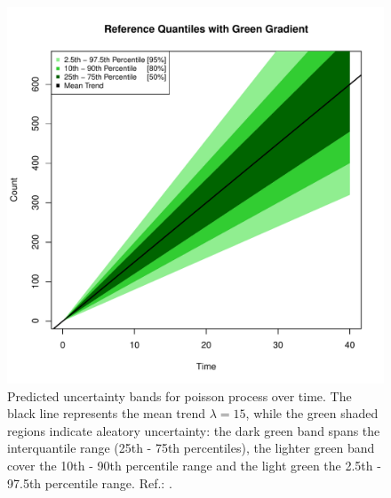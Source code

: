\begin{figure}
\begin{knitrout}
\color{fgcolor}

{\centering \includegraphics[width=\textwidth-3cm]{figure/ch02_figunnamed-chunk-4-1} 

}


\end{knitrout}
  \caption{Predicted uncertainty bands for poisson process over time. The black line represents the mean trend $\lambda = 15$, while the green shaded regions indicate aleatory uncertainty: the dark green band spans the interquantile range (25th - 75th percentiles), the lighter green band cover the 10th - 90th percentile range and the light green the 2.5th - 97.5th percentile range. Ref.: \cite{spiegelhalter2011visualizing}.}
  \label{fig:2_3}
\end{figure}

